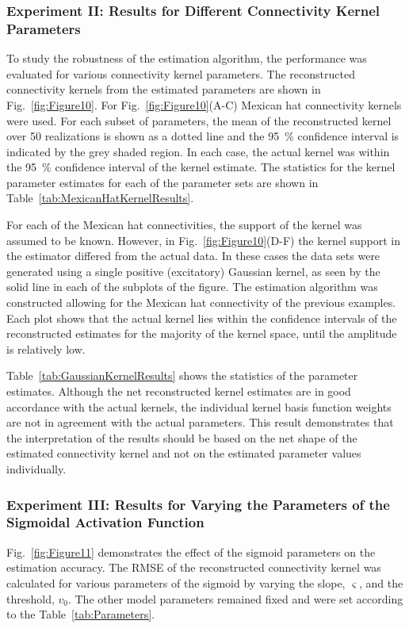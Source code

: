 \documentclass[review,authoryear,3p]{elsarticle}
\begin{document}
\subsubsection{Experiment II: Results for Different Connectivity Kernel Parameters}
To study the robustness of the estimation algorithm, the performance was evaluated for various connectivity kernel parameters. The reconstructed connectivity kernels from the estimated parameters are shown in Fig.~\ref{fig:Figure10}. For Fig.~\ref{fig:Figure10}(A-C) Mexican hat connectivity kernels were used. For each subset of parameters, the mean of the reconstructed kernel over 50 realizations is shown as a dotted line and the 95~\% confidence interval is indicated by the grey shaded region. In each case, the actual kernel was within the 95~\% confidence interval of the kernel estimate. The statistics for the kernel parameter estimates for each of the parameter sets are shown in Table~\ref{tab:MexicanHatKernelResults}.

For each of the Mexican hat connectivities, the support of the kernel was assumed to be known. However, in Fig.~\ref{fig:Figure10}(D-F) the kernel support in the estimator differed from the actual data. In these cases the data sets were generated using a single positive (excitatory) Gaussian kernel, as seen by the solid line in each of the subplots of the figure. The estimation algorithm was constructed allowing for the Mexican hat connectivity of the previous examples. Each plot shows that the actual kernel lies within the confidence intervals of the reconstructed estimates for the majority of the kernel space, until the amplitude is relatively low.

Table~\ref{tab:GaussianKernelResults} shows the statistics of the parameter estimates. Although the net reconstructed kernel estimates are in good accordance with the actual kernels, the individual kernel basis function weights are not in agreement with the actual parameters. This result demonstrates that the interpretation of the results should be based on the net shape of the estimated connectivity kernel and not on the estimated parameter values individually.  

\subsubsection{Experiment III: Results for Varying the Parameters of the Sigmoidal Activation Function}
Fig.~\ref{fig:Figure11} demonstrates the effect of the sigmoid parameters on the estimation accuracy. The RMSE of the reconstructed connectivity kernel was calculated for various parameters of the sigmoid by varying the slope, $\varsigma$, and the threshold, $v_0$. The other model parameters remained fixed and were set according to the Table~\ref{tab:Parameters}.
\end{document}
